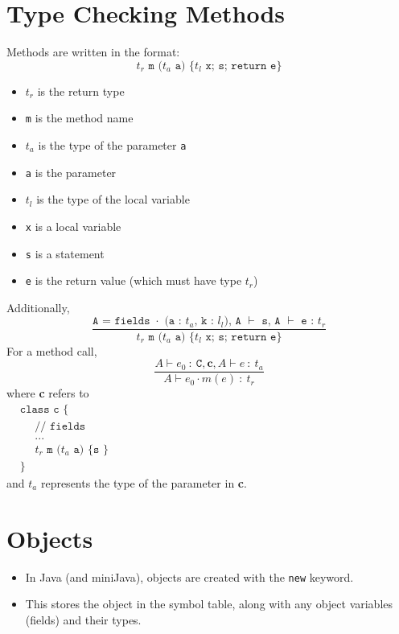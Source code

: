 \documentclass[10pt]{article}
\begin{document}
\section*{Type Checking Methods}
Methods are written in the format:
\[\texttt{$t_r$ m ($t_a$ a) \{$t_l$ x; s; return e\}}\]
\begin{itemize}
    \item $t_r$ is the return type
    \item \texttt{m} is the method name
    \item $t_a$ is the type of the parameter \texttt{a}
    \item \texttt{a} is the parameter
    \item $t_l$ is the type of the local variable
    \item \texttt{x} is a local variable
    \item \texttt{s} is a statement
    \item \texttt{e} is the return value (which must have type $t_r$)
\end{itemize}
Additionally,
\[\frac{\texttt{A = fields $\cdot$ (a : $t_a$, k : $l_l$), A $\vdash$ s, A $\vdash$ e : $t_r$}}{\texttt{$t_r$ m ($t_a$ a) \{$t_l$ x; s; return e\}}}\]
For a method call,
\[\frac{A \vdash e_0\::\: \texttt{C}, \textbf{c}, A \vdash e\::\:t_a}{A \vdash e_0 \cdot m(e)\::\: t_r}\]
where \textbf{c} refers to
\begin{align*}
&\texttt{class c \{}\hspace{13cm}\\
&\texttt{~~~~// fields}\\
&\texttt{~~~~...}\\
&\texttt{~~~~$t_r$ m ($t_a$ a) \{ s \}}\\
&\texttt{\}}
\end{align*}
and $t_a$ represents the type of the parameter in \textbf{c}.

\section*{Objects}
\begin{itemize}
    \item In Java (and miniJava), objects are created with the \texttt{new} keyword.
    \item This stores the object in the symbol table, along with any object variables (fields) and their types.
\end{itemize}   
\end{document}

